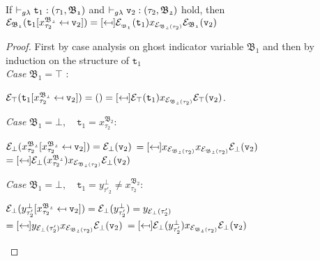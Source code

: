 \begin{lemma} 
	If $\vdash_{g\lambda} \texttt{t}_{1} : (\tau_{1}, \mathfrak{B_{1}})$  
	and \mbox{$\vdash_{g\lambda} \texttt{v}_{2} : (\tau_{2}, \mathfrak{B_{2}})$}	
	hold, then ~~
	$\e_{\mathfrak{B_{1}}}
	(\sbst
		{\texttt{t}_{1}}
		{x^{\mathfrak{B_{2}}}_{\tau_{2}}}
		{\texttt{v}_{2}})
	= \sbst
			{\e_{\mathfrak{_{B_{1}}}}(\texttt{t}_{1})}
			{x_{\e_{\mathfrak{B_{2}}(\tau_{2})}}}
			{\e_{\mathfrak{B_{1}}}(\texttt{v}_{2})}$
\label{Substitution under erasure}
\end{lemma}
\begin{proof}
First by case analysis on ghost indicator variable $\mathfrak{B_{1}}$ 
and then by induction on the structure of $\texttt{t}_{1}$  \\

\noindent\textit{Case} $\mathfrak{B_{1} = \top}$ :

\begin{center}
 $\e_{\top}
	(\sbst
		{\texttt{t}_{1}}
		{x^{\mathfrak{B_{2}}}_{\tau_{2}}}
		{\texttt{v}_{2}}) 
	= () 
	= \sbst
			{\e_{\top}(\texttt{t}_{1})}
			{x_{\e_{\mathfrak{B_{2}}(\tau_{2})}}}
			{\e_{\top}(\texttt{v}_{2})}$.
\end{center}

\noindent\textit{Case} $\mathfrak{B_{1} = \bot},\quad
\texttt{t}_{1} = x^{\mathfrak{B_{2}}}_{\tau_{2}}$:
\begin{center}
 $\mathcal{E}_{\bot}
	(x^{\mathfrak{B_{2}}}_{\tau_{2}} [x^{\mathfrak{B_{2}}}_{\tau_{2}} \mapsfrom \texttt{v}_{2}]) 
	= \mathcal{E}_{\bot}(\texttt{v}_{2}) $ 
	$= \sbst
			{x_{\e_{\mathfrak{B_{2}}(\tau_{2})}}}
			{x_{\e_{\mathfrak{B_{2}}(\tau_{2})}}}
			{\e_{\bot}(\texttt{v}_{2})}$ \\[0.08cm]
	$= \sbst
			{\e_{\bot}(x^{\mathfrak{B_{2}}}_{\tau_{2}})}
			{x_{\e_{\mathfrak{B_{2}}(\tau_{2})}}}
			{\e_{\bot}(\texttt{v}_{2})}$
\end{center}

\noindent\textit{Case} $\mathfrak{B_{1} = \bot},\quad
\texttt{t}_{1} = y^{\bot}_{\tau'_{2}} 
\neq x^{\mathfrak{B_{2}}}_{\tau_{2}}$:
\begin{center}
 $\mathcal{E}_{\bot}
	(y^{\bot}_{\tau'_{2}} [x^{\mathfrak{B_{2}}}_{\tau_{2}} \mapsfrom \texttt{v}_{2}]) 
	= \mathcal{E}_{\bot}(y^{\bot}_{\tau'_{2}}) = y_{\mathcal{E}_{\bot}(\tau'_{2})} $ \\[0.08cm]
	$  = \sbst
			{y_{\e_{\bot}(\tau'_{2})}}
			{x_{\e_{\mathfrak{B_{2}}(\tau_{2})}}}
			{\e_{\bot}(\texttt{v}_{2})}$ 
	$= \sbst
			{\e_{\bot}(y^{\bot}_{\tau'_{2}})}
			{x_{\e_{\mathfrak{B_{2}}(\tau_{2})}}}
			{\e_{\bot}(\texttt{v}_{2})}$
\end{center}


\end{proof}
